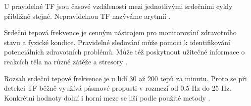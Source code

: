 U pravidelné \acs{TF} jsou časové vzdálenosti mezi jednotlivými srdečními cykly přibližně stejné.
Nepravidelnou \acs{TF} nazýváme arytmií \cite{vnitrniLekarstviVKostce}.

Srdeční tepová frekvence je cenným nástrojem pro monitorování zdravotního stavu a fyzické kondice.
Pravidelné sledování může pomoci k identifikování potenciálních zdravotních problémů.
Může též poskytnout užitečné informace o reakcích těla na různé zátěže a stresory \cite{PoveaCabrera2018}.

Rozsah srdeční tepové frekvence je u lidí 30 až 200 tepů za minutu.
Proto se při detekci \acs{TF} běžně využívá pásmové propusti v rozmezí od 0,5 Hz do 25 Hz.
Konkrétní hodnoty dolní i horní meze se liší podle použité metody \cite{PyPPG}.

